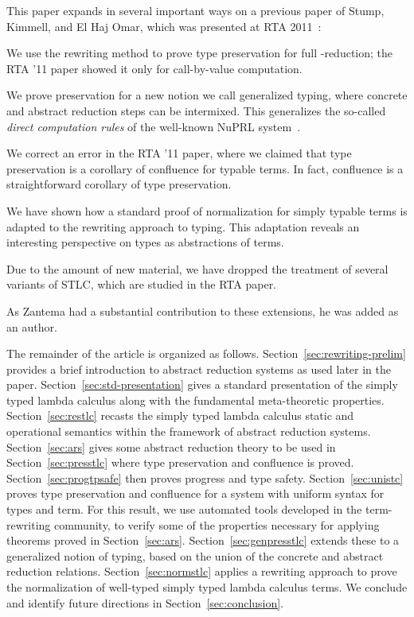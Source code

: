 \documentclass{LMCS}
\begin{document}
This paper expands in several important ways on a previous paper of
Stump, Kimmell, and El Haj Omar, which was presented at RTA 2011~\cite{stump+11}:
\begin{iteMize}{}
\item 
We use the rewriting method to prove type preservation for full
-reduction; the RTA '11 paper showed it only for call-by-value
computation.
\item We prove preservation for a new notion we call generalized
  typing, where concrete and abstract reduction steps can be
  intermixed.  This generalizes the so-called \emph{direct computation
  rules} of the well-known NuPRL system~\cite{allen+06}.
\item We correct an error in the RTA '11 paper, where we claimed that
  type preservation is a corollary of confluence for typable terms.
  In fact, confluence is a straightforward corollary of type preservation.
\item We have shown how a standard proof of normalization for simply
  typable terms is adapted to the rewriting approach to typing.  This
  adaptation reveals an interesting perspective on types as
  abstractions of terms.
\item Due to the amount of new material, we have dropped the treatment
  of several variants of STLC, which are studied in the RTA paper.
\end{iteMize}
As Zantema had a substantial contribution to these extensions, he was
added as an author.  

The remainder of the article is organized as
follows. Section~\ref{sec:rewriting-prelim} provides a brief
introduction to abstract reduction systems as used later in the
paper. Section~\ref{sec:std-presentation} gives a standard
presentation of the simply typed lambda calculus along with the
fundamental meta-theoretic properties. Section~\ref{sec:restlc}
recasts the simply typed lambda calculus static and operational
semantics within the framework of abstract reduction systems.
Section~\ref{sec:ars} gives some abstract reduction theory to be used
in Section~\ref{sec:presstlc} where type preservation and confluence
is proved.  Section~\ref{sec:progtpsafe} then proves progress and type
safety.  Section~\ref{sec:unistc} proves type preservation and
confluence for a system with uniform syntax for types and term.  For
this result, we use automated tools developed in the term-rewriting
community, to verify some of the properties necessary for applying
theorems proved in Section~\ref{sec:ars}.
Section~\ref{sec:genpresstlc} extends these to a generalized notion of
typing, based on the union of the concrete and abstract reduction
relations.  Section~\ref{sec:normstlc} applies a rewriting approach to
prove the normalization of well-typed simply typed lambda calculus
terms. We conclude and identify future directions in
Section~\ref{sec:conclusion}.
\end{document}
